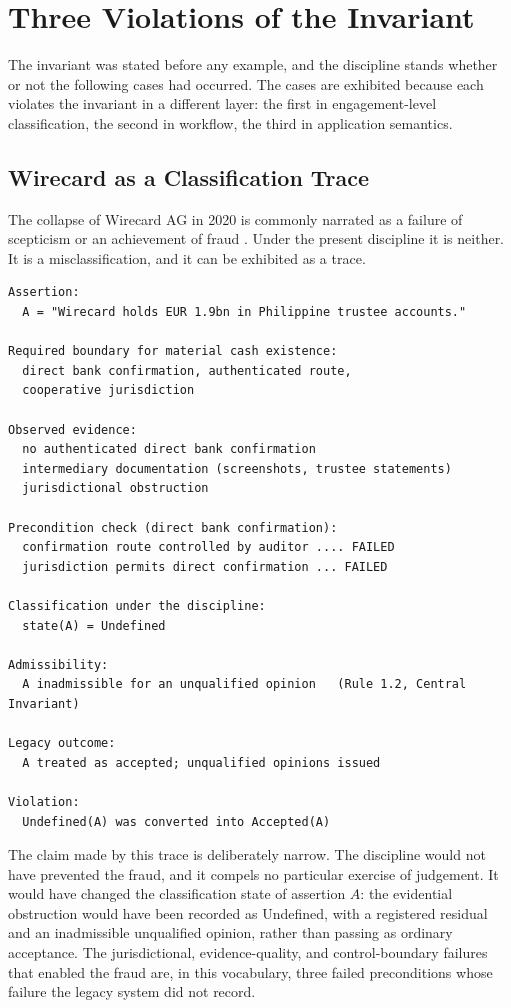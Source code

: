 \documentclass[smallcondensed,envcountsect,natbib]{svjour3}
\newcommand{\state}[1]{\textsf{#1}}
\begin{document}
\section{Three Violations of the Invariant}
\label{sec:examples}

The invariant was stated before any example, and the discipline stands whether or not the following cases had occurred. The cases are exhibited because each violates the invariant in a different layer: the first in engagement-level classification, the second in workflow, the third in application semantics.

\subsection{Wirecard as a Classification Trace}
\label{sec:wirecard}

The collapse of Wirecard AG in 2020 is commonly narrated as a failure of scepticism or an achievement of fraud \citep{mccrum2022, esma2020}. Under the present discipline it is neither. It is a misclassification, and it can be exhibited as a trace.

\begin{lstlisting}
Assertion:
  A = "Wirecard holds EUR 1.9bn in Philippine trustee accounts."

Required boundary for material cash existence:
  direct bank confirmation, authenticated route,
  cooperative jurisdiction

Observed evidence:
  no authenticated direct bank confirmation
  intermediary documentation (screenshots, trustee statements)
  jurisdictional obstruction

Precondition check (direct bank confirmation):
  confirmation route controlled by auditor .... FAILED
  jurisdiction permits direct confirmation ... FAILED

Classification under the discipline:
  state(A) = Undefined

Admissibility:
  A inadmissible for an unqualified opinion   (Rule 1.2, Central Invariant)

Legacy outcome:
  A treated as accepted; unqualified opinions issued

Violation:
  Undefined(A) was converted into Accepted(A)
\end{lstlisting}

The claim made by this trace is deliberately narrow. The discipline would not have prevented the fraud, and it compels no particular exercise of judgement. It would have changed the classification state of assertion $A$: the evidential obstruction would have been recorded as \state{Undefined}, with a registered residual and an inadmissible unqualified opinion, rather than passing as ordinary acceptance. The jurisdictional, evidence-quality, and control-boundary failures that enabled the fraud are, in this vocabulary, three failed preconditions whose failure the legacy system did not record.
\end{document}
